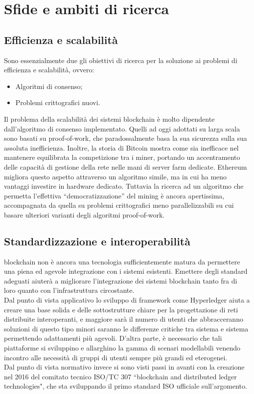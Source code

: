 \section{Sfide e ambiti di ricerca}

    \subsection{Efficienza e scalabilità}
        Sono essenzialmente due gli obiettivi di ricerca per la soluzione ai problemi di efficienza e scalabilità, ovvero:
        \begin{itemize}
            \item Algoritmi di consenso;
            \item Problemi crittografici nuovi.
        \end{itemize}
        Il problema della scalabilità dei sistemi blockchain è molto dipendente dall'algoritmo di consenso implementato. Quelli ad oggi adottati su larga scala sono basati su proof-of-work, che paradossalmente basa la sua sicurezza sulla sua assoluta inefficienza. Inoltre, la storia di Bitcoin mostra come sia inefficace nel mantenere equilibrata la competizione tra i miner, portando un accentramento delle capacità di gestione della rete nelle mani di server farm dedicate. Ethereum migliora questo aspetto attraverso un algoritmo simile, ma in cui ha meno vantaggi investire in hardware dedicato. Tuttavia la ricerca ad un algoritmo che permetta l'effettiva ``democratizzazione'' del mining è ancora apertissima, accompagnata da quella su problemi crittografici meno parallelizzabili su cui basare ulteriori varianti degli algoritmi proof-of-work.
        
    \subsection{Standardizzazione e interoperabilità}
        blockchain non è ancora una tecnologia sufficientemente matura da permettere una piena ed agevole integrazione con i sistemi esistenti. Emettere degli standard adeguati aiuterà a migliorare l'integrazione dei sistemi blockchain tanto fra di loro quanto con l'infrastruttura circostante. \\
        Dal punto di vista applicativo lo sviluppo di framework come Hyperledger aiuta a creare una base solida e delle sottostrutture chiare per la progettazione di reti distribuite interoperanti, e maggiore sarà il numero di utenti che abbracceranno soluzioni di questo tipo minori saranno le differenze critiche tra sistema e sistema permettendo adattamenti più agevoli. D'altra parte, è necessario che tali piattaforme si sviluppino e allarghino la gamma di scenari modellabili venendo incontro alle necessità di gruppi di utenti sempre più grandi ed eterogenei. \\
        Dal punto di vista normativo invece si sono visti passi in avanti con la creazione nel 2016 del comitato tecnico ISO/TC 307 ``blockchain and distributed ledger technologies", che sta sviluppando il primo standard ISO ufficiale sull'argomento.

